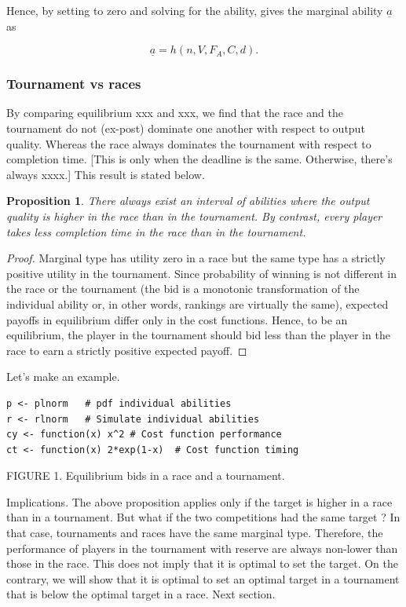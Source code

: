 \documentclass[12pt,]{article}
\theoremstyle{plain} %
\newtheorem{proposition}{Proposition}
\begin{document}
Hence, by setting to zero and solving for the ability, gives the
marginal ability \({\underline a}\) as

\begin{equation}
  {\underline a}= h(n, V, F_A, C, d).
\end{equation}

\subsubsection{Tournament vs races}\label{tournament-vs-races}

By comparing equilibrium xxx and xxx, we find that the race and the
tournament do not (ex-post) dominate one another with respect to output
quality. Whereas the race always dominates the tournament with respect
to completion time. {[}This is only when the deadline is the same.
Otherwise, there's always xxxx.{]} This result is stated below.

\begin{proposition}
There always exist an interval of abilities where the output quality is higher in the race than in the tournament. By contrast, every player takes less completion time in the race than in the tournament.
\end{proposition}

\begin{proof}
Marginal type has utility zero in a race but the same type has a strictly positive utility in the tournament. Since probability of winning is not different in the race or the tournament (the bid is a monotonic transformation of the individual ability or, in other words, rankings are virtually the same), expected payoffs in equilibrium differ only in the cost functions. Hence, to be an equilibrium, the player in the tournament should bid less than the player in the race to earn a strictly positive expected payoff. 
\end{proof}

Let's make an example.

\begin{verbatim}
p <- plnorm   # pdf individual abilities 
r <- rlnorm   # Simulate individual abilities
cy <- function(x) x^2 # Cost function performance
ct <- function(x) 2*exp(1-x)  # Cost function timing 
\end{verbatim}

FIGURE 1. Equilibrium bids in a race and a tournament.

Implications. The above proposition applies only if the target is higher
in a race than in a tournament. But what if the two competitions had the
same target ? In that case, tournaments and races have the same marginal
type. Therefore, the performance of players in the tournament with
reserve are always non-lower than those in the race. This does not imply
that it is optimal to set the target. On the contrary, we will show that
it is optimal to set an optimal target in a tournament that is below the
optimal target in a race. Next section.
\end{document}
